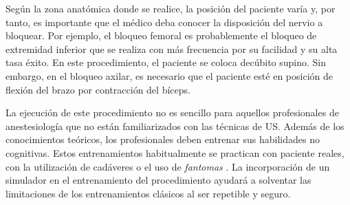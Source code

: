    
Según la zona anatómica donde se realice, la posición del paciente varía y, por tanto, es importante que el médico deba conocer la disposición del nervio a bloquear. Por ejemplo, el bloqueo femoral es probablemente el bloqueo de extremidad inferior que se realiza con más frecuencia por su facilidad y su alta tasa éxito. En este procedimiento, el paciente se coloca decúbito supino. Sin embargo, en el bloqueo axilar, es necesario que el paciente esté en posición de flexión del brazo por contracción del bíceps.


La ejecución de este procedimiento no es sencillo para aquellos profesionales de anestesiología que no están familiarizados con las técnicas de \ac{US}. Además de los conocimientos teóricos, los profesionales deben entrenar sus habilidades no cognitivas. Estos entrenamientos habitualmente se practican con paciente reales, con la utilización de cadáveres \cite{Tsui2007} o el uso de \emph{fantomas} \cite{phantomra}. La incorporación de un simulador en el entrenamiento del procedimiento ayudará a solventar las limitaciones de los entrenamientos clásicos al ser repetible y seguro.


